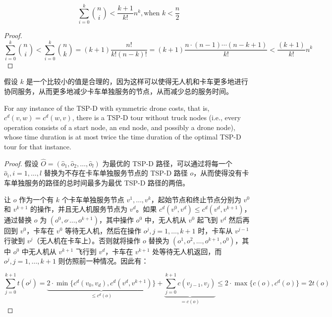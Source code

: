 \documentclass[fontset=none]{ctexart}
\begin{document}
\begin{theorem*}
    \begin{equation*}
        \sum_{i = 0}^k\binom{n}{i} < \frac{k + 1}{k!}n^k, \text{when } k < \frac{n}{2}
    \end{equation*}
\end{theorem*}
\begin{proof}
    \begin{equation*}
        \sum_{i = 0}^k\binom{n}{i} < \sum_{i = 0}^k \binom{n}{k} = (k + 1)\frac{n!}{k!(n - k)!} = (k+1)\frac{n\cdot(n -1)\cdots(n-k+1)}{k!} < \frac{(k + 1)}{k!}n^k
    \end{equation*}
\end{proof}

假设 $k$ 是一个比较小的值是合理的，因为这样可以使得无人机和卡车更多地进行协同服务，从而更多地减少卡车单独服务的节点，从而减少总的服务时间。

\begin{theorem*}
    For any instance of the TSP-D with symmetric drone costs, that is, $c^d(v, w) = c^d(w, v)$, there is a TSP-D tour without truck nodes (i.e., every operation consists of a start node, an end node, and possibly a drone node), whose time duration is at most twice the time duration of the optimal TSP-D tour for that instance.
\end{theorem*}
\begin{proof}
    假设 $\hat{O} = (\hat{o}_1, \hat{o}_2, \dots, \hat{o}_l)$ 为最优的 TSP-D 路径，可以通过将每一个 $\hat{o}_i, i = 1, \dots, l$ 替换为不存在卡车单独服务节点的 TSP-D 路径 $o$，从而使得没有卡车单独服务的路径的总时间最多为最优 TSP-D 路径的两倍。

    让 $o$ 作为一个有 $k$ 个卡车单独服务节点 $v^1,\dots,v^k$，起始节点和终止节点分别为 $v^0$ 和 $v^{k + 1}$ 的操作，并且无人机服务节点为 $v^d$。如果 $c^d(v^0, v^d) \leq c^d(v^d, v^{k + 1})$，通过替换 $o$ 为 $(o^0,o^, \dots, o^{k + 1})$，其中操作 $o^0$ 中，无人机从 $v^0$ 起飞到 $v^d$ 然后再回到 $v^0$，卡车在 $v^0$ 等待无人机，然后在操作 $o^j, j = 1, \dots, k + 1$ 时，卡车从 $v^{j - 1}$ 行驶到 $v^{j}$（无人机在卡车上）。否则就将操作 $o$ 替换为 $(o^1, o^2, \dots, o^{k+1},o^0)$，其中 $o^0$ 中无人机从 $v^{k+1}$ 飞行到 $v^d$，卡车在 $v^{k + 1}$ 处等待无人机返回，而 $o^j, j = 1, \dots, k + 1$ 则仿照前一种情况。因此有：

    \begin{equation*}
        \sum_{j=0}^{k+1} t(o^j) = \underbrace{2 \cdot \min\{ c^d(v_0, v_d), c^d(v^d, v^{k+1}) \}}_{\leq c^d(o)} + \underbrace{\sum_{j=0}^{k+1} c(v_{j-1}, v_j)}_{= c(o)} \leq 2 \cdot \max\{ c(o), c^d(o) \} = 2t(o)
    \end{equation*}
\end{proof}
\end{document}
